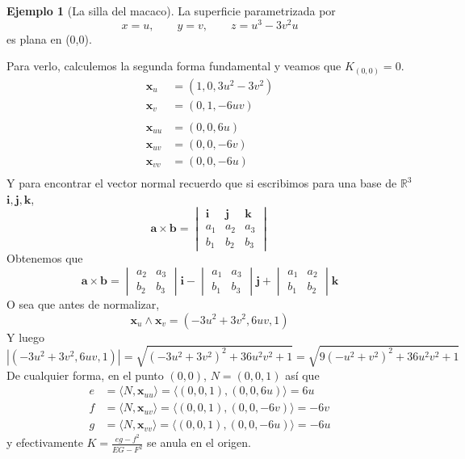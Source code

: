 \documentclass[spanish]{book}
\theoremstyle{definition}
\newtheorem*{ejem}{Ejemplo}
\begin{document}
\begin{ejem}[La silla del macaco]
	La superficie parametrizada por
	\[x=u,\qquad y=v,\qquad z=u^3-3v^2u\]
	es plana en (0,0).
	
	Para verlo, calculemos la segunda forma fundamental y veamos que $K_{(0,0)}=0$.
	\begin{align*}
		\mathbf x_{u}&=(1,0,3u^2-3v^2)\\
		\mathbf x_{v}&=(0,1,-6uv)\\\\
		\mathbf x_{uu}&=(0,0,6u)\\
		\mathbf x_{uv}&=(0,0,-6v)\\
		\mathbf x_{vv}&=(0,0,-6u)\\
	\end{align*}
	Y para encontrar el vector normal recuerdo que si escribimos para una base de $\mathbb R^3$ $\mathbf{i},\mathbf{j},\mathbf{k}$,
	\[\mathbf{a}\times\mathbf{b}=\begin{vmatrix}
		\mathbf{i}&\mathbf{j}&\mathbf{k}\\
		a_1&a_2&a_3\\
		b_1&b_2&b_3
	\end{vmatrix}\]
	Obtenemos que
	\[\mathbf{a}\times\mathbf{b}=\begin{vmatrix}
		a_2&a_3\\
		b_2&b_3
		\end{vmatrix}\mathbf{i}-
		\begin{vmatrix}
		a_1&a_3\\
		b_1&b_3
		\end{vmatrix}\mathbf{j}+
		\begin{vmatrix}
			a_1&a_2\\
			b_1&b_2
		\end{vmatrix}\mathbf{k}\]
	O sea que antes de normalizar,
	\[\mathbf{x}_u\wedge\mathbf{x}_v=(-3u^2+3v^2,6uv,1)\]
	Y luego
	\[|(-3u^2+3v^2,6uv,1)|=\sqrt{(-3u^2+3v^2)^2+36u^2v^2+1}=\sqrt{9(-u^2+v^2)^2+36u^2v^2+1}\]
	De cualquier forma, en el punto $(0,0)$, $N=(0,0,1)$ así que
	\begin{align*}
		e&=\langle N,\mathbf x_{uu}\rangle=\langle(0,0,1),(0,0,6u)\rangle=6u\\
		f&=\langle N,\mathbf x_{uv}\rangle=\langle(0,0,1),(0,0,-6v)\rangle=-6v\\
		g&=\langle N,\mathbf x_{vv}\rangle=\langle(0,0,1),(0,0,-6u)\rangle=-6u
	\end{align*}
	y efectivamente $K=\frac{eg-f^2}{EG-F^2}$ se anula en el origen.
		\begin{figure}[H]

\end{figure}
\end{ejem}
\end{document}
